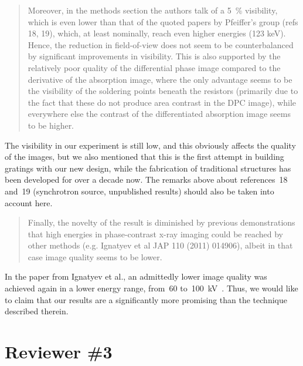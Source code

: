 \documentclass[a4paper]{scrartcl}
\begin{document}
\begin{quote}
    Moreover, in the methods section the authors talk of a
    \SI{5}{\percent} visibility, which is even lower than that of the quoted papers by Pfeiffer's group (refs 18, 19), which, at least nominally, reach even higher energies (123 keV). Hence, the reduction in field-of-view does not seem to be counterbalanced by significant improvements in visibility. This is also supported by the relatively poor quality of the differential phase image compared to the derivative of the absorption image, where the only advantage seems to be the visibility of the soldering points beneath the resistors (primarily due to the fact that these do not produce area contrast in the DPC image), while everywhere else the contrast of the differentiated absorption image seems to be higher.
\end{quote}
The visibility in our experiment is still low, and this obviously
affects the quality of the images, but we also mentioned
that this is the first attempt in building gratings with our new design,
while the fabrication of traditional structures has been developed for over
a decade now. The remarks above about references~18 and~19 (synchrotron
source, unpublished results) should also be taken into account here.
\begin{quote}
Finally, the novelty of the result is diminished by previous demonstrations that high energies in phase-contrast x-ray imaging could be reached by other methods (e.g. Ignatyev et al JAP 110 (2011) 014906), albeit in that case image quality seems to be lower.     
\end{quote}
In the paper from Ignatyev et al., an admittedly lower image quality was
achieved again in a lower energy range, from~\num{60}
to~\SI{100}{\kilo\volt\peak}. Thus, we would like to claim that our results
are a significantly more promising than the technique described therein.

\section*{Reviewer \#3}
\end{document}
